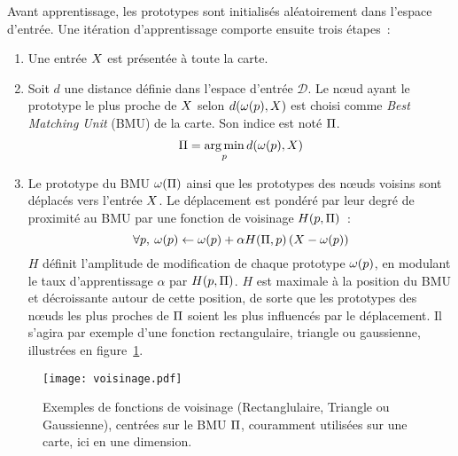 \documentclass[../main]{subfiles}
\begin{document}
Avant apprentissage, les prototypes sont initialisés aléatoirement dans l'espace d'entrée.
Une itération d'apprentissage comporte ensuite trois étapes~:
\begin{enumerate}
\item Une entrée $X$ est présentée à toute la carte.
\item Soit $d$ une distance définie dans l'espace d'entrée $\mathcal{D}$. Le n\oe{}ud ayant le prototype le plus proche de $X$ selon $d(\omega(p), X)$ est choisi comme \emph{Best Matching Unit} (BMU) de la carte. Son indice est noté $\Pi$.
\begin{equation}
    \Pi = \operatorname*{arg\,min}\limits_p d(\omega(p),X)
\end{equation}
\item Le prototype du BMU $\omega(\Pi)$ ainsi que les prototypes des n\oe{}uds voisins sont déplacés vers l'entrée $X$. Le déplacement est pondéré par leur degré de proximité au BMU par une fonction de voisinage $H(p,\Pi)$~:
\begin{equation} \forall p, \:\omega(p) \leftarrow \omega(p) + \alpha H(\Pi,p) \left( X - \omega(p)\right) \end{equation}
$H$ définit l'amplitude de modification de chaque prototype $\omega(p)$, en modulant le taux d'apprentissage $\alpha$ par $H(p,\Pi)$. $H$ est maximale à la position du BMU et décroissante autour de cette position, de sorte que les prototypes des n\oe{}uds les plus proches de $\Pi$ soient les plus influencés par le déplacement. Il s'agira par exemple d'une fonction rectangulaire, triangle ou gaussienne, illustrées en figure~\ref{fig:h}.
\end{enumerate}

\begin{figure}
     \centering
     \texttt{[image: voisinage.pdf]}
     \caption{Exemples de fonctions de voisinage (Rectanglulaire, Triangle ou Gaussienne), centrées sur le BMU $\Pi$, couramment utilisées sur une carte, ici en une dimension.\label{fig:h}}
\end{figure}
\end{document}
